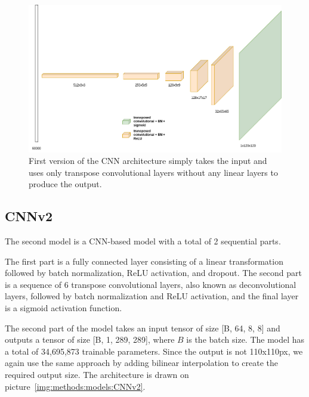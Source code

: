 \begin{figure}[H]\centering
\includegraphics[width=140mm]{img/cnnv1.drawio.png}
\caption{First version of the CNN architecture simply takes the input and uses only transpose convolutional layers without any linear layers to produce the output.}
\label{img:methods:models:CNNv1}
\end{figure}


\subsection{CNNv2}
\label{methods:models:CNNv2}
The second model is a CNN-based model with a total of 2 sequential parts.

The first part is a fully connected layer consisting of a linear transformation followed by batch normalization, ReLU activation, and dropout. The second part is a sequence of 6 transpose convolutional layers, also known as deconvolutional layers, followed by batch normalization and ReLU activation, and the final layer is a sigmoid activation function. 

The second part of the model takes an input tensor of size [B, 64, 8, 8] and outputs a tensor of size [B, 1, 289, 289], where $B$ is the batch size. The model has a total of 34,695,873 trainable parameters. Since the output is not 110x110px, we again use the same approach by adding bilinear interpolation to create the required output size. The architecture is drawn on picture~\ref{img:methods:models:CNNv2}.

